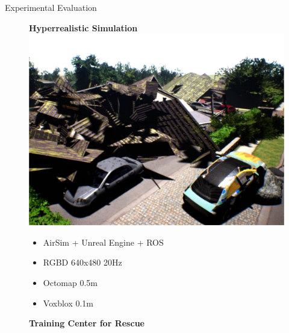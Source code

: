 \documentclass[10pt]{beamer}
\begin{document}
    \begin{frame}{Experimental Evaluation}
        \begin{figure}%
            \begin{minipage}{0.475\linewidth}
                \centering
                \textbf{Hyperrealistic Simulation}
                \includegraphics[width=\textwidth]{images/Fig5a.png}
                \vspace{-0.25cm}
                {
                    \scriptsize
                    \begin{itemize}
                        \item AirSim + Unreal Engine + ROS
                        \item RGBD 640x480 20Hz
                        \item Octomap 0.5m
                        \item Voxblox 0.1m
                    \end{itemize}
                    \vspace{-0.15cm}
                }
            \end{minipage}
            \hspace{0.2cm}
            \begin{minipage}{0.475\linewidth}
                \centering
                \textbf{Training Center for Rescue}

\end{minipage}
\end{figure}
\end{frame}
\end{document}
